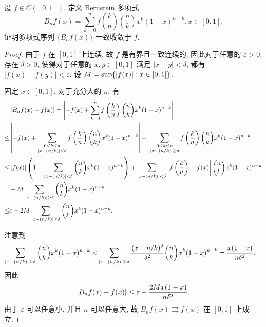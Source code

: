 \documentclass{article}
\begin{document}
\begin{problem}
  设 \( f\in C([0,1]) \). 定义 Bernstein 多项式
  \[ B_nf(x) = \sum_{k=0}^{n}f\left( \frac{k}{n} \right)\binom{n}{k}x^k(1-x)^{n-k}, x\in [0,1]. \]
  证明多项式序列 \( \{B_nf(x)\} \) 一致收敛于 \( f \). 
\end{problem}

\begin{proof}
  由于 \( f \) 在 \( [0,1] \) 上连续, 故 \( f \) 是有界且一致连续的. 因此对于任意的 \( \varepsilon>0 \), 存在 \( \delta>0 \), 使得对于任意的 \( x,y\in[0,1] \) 满足 \( |x-y|<\delta \), 都有 \( |f(x)-f(y)|<\varepsilon \). 设 \( M=\sup\{\left|f(x)\right|:x\in[0,1]\} \).

  固定 \( x\in[0,1] \). 对于充分大的 \( n \), 有
  \begin{align*}
    &\left|B_nf(x)-f(x)\right|
    = \left| -f(x) + \sum_{k=0}^{n} f\left( \frac{k}{n} \right) \binom{n}{k}x^k(1-x)^{n-k} \right| \\
    \le& \left| -f(x) + \sum_{\substack{ 0\le k\le n \\ \left|x-(n/k)\right|<\delta }}^{}f\left( \frac{k}{n} \right) \binom{n}{k}x^k(1-x)^{n-k} \right|
    +\left| \sum_{\substack{ 0\le k\le n \\ \left|x-(n/k)\right|\ge\delta }}^{}f\left( \frac{k}{n} \right) \binom{n}{k}x^k(1-x)^{n-k} \right|\\
    \le& \left|f(x)\right|\left( 1-\sum_{\left|x-(n/k)\right|<\delta }^{}\binom{n}{k}x^k(1-x)^{n-k} \right)
    + \sum_{\left|x-(n/k)\right|<\delta }^{}\left|f\left(\frac{k}{n}\right)-f(x) \right| \binom{n}{k}x^k(1-x)^{n-k}\\
    &+ M \sum_{\left|x-(n/k)\right|\ge\delta }^{}\binom{n}{k}x^k(1-x)^{n-k}\\
    \le& \varepsilon + 2M \sum_{\left|x-(n/k)\right|\ge\delta }^{} \binom{n}{k}x^k(1-x)^{n-k}.
  \end{align*}

  注意到
  \begin{align*}
    \sum_{\left|x-(n/k)\right|\ge\delta }^{} \binom{n}{k}x^k(1-x)^{n-k}
    <& \sum_{\left|x-(n/k)\right|\ge\delta }^{} \frac{(x-n/k)^2}{\delta^2}\binom{n}{k}x^k(1-x)^{n-k}
    =\frac{x(1-x)}{n\delta^2}.
  \end{align*}
  因此
  \[ \left|B_nf(x)-f(x)\right| \le \varepsilon+ \frac{2M x(1-x)}{n\delta^2}. \]
  由于 \( \varepsilon \) 可以任意小, 并且 \( n \) 可以任意大, 故 \( B_nf(x) \rightrightarrows f(x) \) 在 \( [0,1] \) 上成立.
\end{proof}
\end{document}
